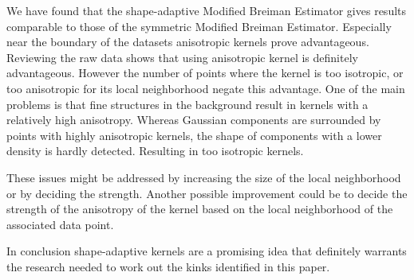 
We have found that the shape-adaptive Modified Breiman Estimator gives results comparable to those of the symmetric Modified Breiman Estimator. Especially near the boundary of the datasets anisotropic kernels prove advantageous. Reviewing the raw data shows that using anisotropic kernel is definitely advantageous. However the number of points where the kernel is too isotropic, or too anisotropic for its local neighborhood negate this advantage. 
One of the main problems is that fine structures in the background result in kernels with a relatively high anisotropy. 
Whereas Gaussian components are surrounded by points with highly anisotropic kernels, the shape of components with a lower density is hardly detected. Resulting in too isotropic kernels. 

These issues might be addressed by increasing the size of the local neighborhood or by deciding the strength. Another possible improvement could be to decide the strength of the anisotropy of the kernel based on the local neighborhood of the associated data point.

In conclusion shape-adaptive kernels are a promising idea that definitely warrants the research needed to work out the kinks identified in this paper.